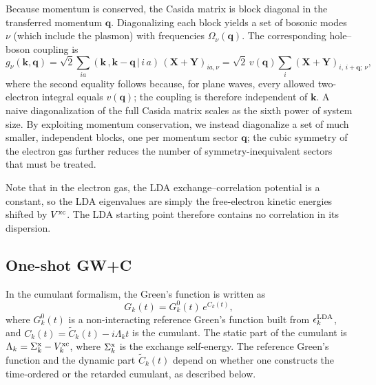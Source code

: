 \documentclass[letterpaper]{article}
\begin{document}
Because momentum is conserved, the Casida matrix is block diagonal in the transferred momentum $\mathbf{q}$. Diagonalizing each block yields a set of bosonic modes $\nu$ (which include the plasmon) with frequencies $\Omega_\nu(\mathbf{q})$. The corresponding hole--boson coupling is
\begin{equation}
g_{\nu}(\mathbf{k},\mathbf{q}) = \sqrt{2}\sum_{ia} (\mathbf{k}\,,\mathbf{k}-\mathbf{q}\,|\,i\,a)\,(\mathbf{X}+\mathbf{Y})_{ia,\nu}
= \sqrt{2}\,v(\mathbf{q})\sum_{i}(\mathbf{X}+\mathbf{Y})_{i,\,i+\mathbf{q};\,\nu},
\label{eq:coupling}
\end{equation}
where the second equality follows because, for plane waves, every allowed two-electron integral equals $v(\mathbf{q})$; the coupling is therefore independent of $\mathbf{k}$. A naive diagonalization of the full Casida matrix scales as the sixth power of system size. By exploiting momentum conservation, we instead diagonalize a set of much smaller, independent blocks, one per momentum sector $\mathbf{q}$; the cubic symmetry of the electron gas further reduces the number of symmetry-inequivalent sectors that must be treated.

Note that in the electron gas, the LDA exchange--correlation potential is a constant, so the LDA eigenvalues are simply the free-electron kinetic energies shifted by $V^{\rm xc}$. The LDA starting point therefore contains no correlation in its dispersion.

\subsection{One-shot {GW}+C}
\label{sec:gwc}
In the cumulant formalism, the Green's function is written as
\begin{equation}
G_k(t) = G_k^{0}(t)\, e^{C_k(t)},
\label{eq:cumulant}
\end{equation}
where $G_k^{0}(t)$ is a non-interacting reference Green's function built from $\epsilon_k^{\rm LDA}$, and $C_k(t) = \tilde{C}_k(t) - i\Lambda_k t$ is the cumulant. The static part of the cumulant is $\Lambda_k = \Sigma_k^{\rm x} - V_k^{\rm xc}$, where $\Sigma_k^{\rm x}$ is the exchange self-energy. The reference Green's function and the dynamic part $\tilde{C}_k(t)$ depend on whether one constructs the time-ordered or the retarded cumulant, as described below.
\end{document}
